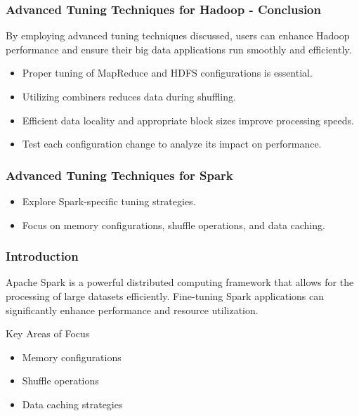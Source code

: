 \documentclass[aspectratio=169]{beamer}
\begin{document}
\begin{frame}[fragile]
    \frametitle{Advanced Tuning Techniques for Hadoop - Conclusion}
    By employing advanced tuning techniques discussed, users can enhance Hadoop performance and ensure their big data applications run smoothly and efficiently. 
    \begin{itemize}
        \item Proper tuning of MapReduce and HDFS configurations is essential.
        \item Utilizing combiners reduces data during shuffling.
        \item Efficient data locality and appropriate block sizes improve processing speeds.
        \item Test each configuration change to analyze its impact on performance.
    \end{itemize}
\end{frame}

\begin{frame}
    \frametitle{Advanced Tuning Techniques for Spark}
    \begin{itemize}
        \item Explore Spark-specific tuning strategies.
        \item Focus on memory configurations, shuffle operations, and data caching.
    \end{itemize}
\end{frame}

\begin{frame}
    \frametitle{Introduction}
    Apache Spark is a powerful distributed computing framework that allows for the processing of large datasets efficiently. Fine-tuning Spark applications can significantly enhance performance and resource utilization.
    
    \begin{block}{Key Areas of Focus}
        \begin{itemize}
            \item Memory configurations
            \item Shuffle operations
            \item Data caching strategies
        \end{itemize}
    \end{block}
\end{frame}
\end{document}
